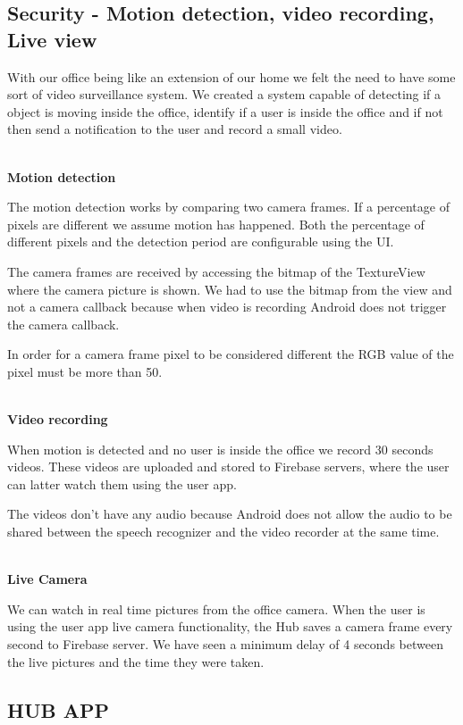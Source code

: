 \subsection{Security - Motion detection, video recording, Live view}

With our office being like an extension of our home we felt the need to have some sort of video surveillance system. We created a system capable of detecting if a object is moving inside the office, identify if a user is inside the office and if not then send a notification to the user and record a small video.


\mbox{}\\
\textbf{Motion detection}

The motion detection works by comparing two camera frames. If a percentage of pixels are different we assume motion has happened. Both the percentage of different pixels and the detection period are configurable using the \ac{UI}.

The camera frames are received by accessing the bitmap of the TextureView where the camera picture is shown. We had to use the bitmap from the view and not a camera callback because when video is recording Android does not trigger the camera callback.

In order for a camera frame pixel to be considered different the RGB value of the pixel must be more than 50.


\mbox{}\\
\textbf{Video recording}

When motion is detected and no user is inside the office we record 30 seconds videos. These videos are uploaded and stored to Firebase servers, where the user can latter watch them using the user app.

The videos don't have any audio because Android does not allow the audio to be shared between the speech recognizer and the video recorder at the same time.


\mbox{}\\
\textbf{Live Camera}

We can watch in real time pictures from the office camera. When the user is using the user app live camera functionality, the Hub saves a camera frame every second to Firebase server. We have seen a minimum delay of 4 seconds between the live pictures and the time they were taken.


\subsection{HUB APP}

